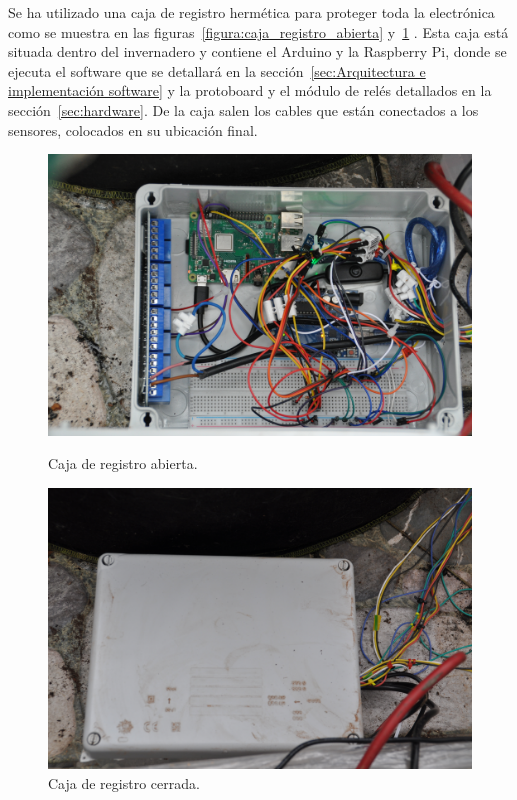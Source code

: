 \documentclass[a4paper, 12pt, oneside]{book}
\begin{document}
Se ha utilizado una caja de registro hermética para proteger toda la electrónica como se muestra en las figuras~\ref{figura:caja_registro_abierta} y~\ref{figura:caja_registro_cerrada} . Esta caja está situada dentro del invernadero y contiene el Arduino y la Raspberry Pi, donde se ejecuta el software que se detallará en la sección~\ref{sec:Arquitectura e implementación software} y la protoboard y el módulo de relés detallados en la sección~\ref{sec:hardware}. De la caja salen los cables que están conectados a los sensores, colocados en su ubicación final.
\begin{figure}[H]
  \centering
  \begin{minipage}[b]{0.4\textwidth}
    \includegraphics[width=\textwidth]{img/caja_registro_abierta}
    \caption{Caja de registro abierta.}
    \label{figura:caja_registro_abierta}
  \end{minipage}
  \hfill
  \begin{minipage}[b]{0.4\textwidth}
    \includegraphics[width=\textwidth]{img/caja_registro_cerrada}
    \caption{Caja de registro cerrada.}
    \label{figura:caja_registro_cerrada}
  \end{minipage}
\end{figure}
\end{document}
